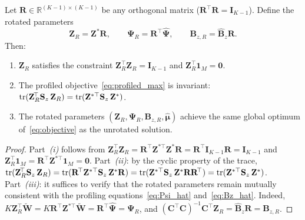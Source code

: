 \begin{proposition}
\label{prop:rotation_invariance}
Let $\mathbf{R}\in\mathbb{R}^{(K-1)\times(K-1)}$ be any orthogonal
matrix ($\mathbf{R}^{\!\top}\mathbf{R} = \mathbf{I}_{K-1}$). Define
the rotated parameters
\begin{equation}
  \mathbf{Z}_R = \mathbf{Z}^*\mathbf{R}, \qquad
  \boldsymbol{\Psi}_R = \mathbf{R}^{\!\top}\hat{\boldsymbol{\Psi}}, \qquad
  \mathbf{B}_{z,R} = \hat{\mathbf{B}}_z\mathbf{R}.
  \label{eq:rotated_params}
\end{equation}
Then:
\begin{enumerate}
  \item[\emph{(i)}]
    $\mathbf{Z}_R$ satisfies the constraint
    $\mathbf{Z}_R^{\!\top}\mathbf{Z}_R = \mathbf{I}_{K-1}$ and
    $\mathbf{Z}_R^{\!\top}\mathbf{1}_M = \mathbf{0}$.
  \item[\emph{(ii)}]
    The profiled objective~\eqref{eq:profiled_max} is invariant:
    $\operatorname{tr}(\mathbf{Z}_R^{\!\top}\mathbf{S}_z\,\mathbf{Z}_R)
     = \operatorname{tr}(\mathbf{Z}^{*\top}\mathbf{S}_z\,\mathbf{Z}^*)$.
  \item[\emph{(iii)}]
    The rotated parameters $(\mathbf{Z}_R,\boldsymbol{\Psi}_R,
    \mathbf{B}_{z,R},\hat{\boldsymbol{\mu}})$ achieve the same
    global optimum of~\eqref{eq:objective} as the unrotated solution.
\end{enumerate}
\end{proposition}
 
\begin{proof}
Part~\emph{(i)} follows from
$\mathbf{Z}_R^{\!\top}\mathbf{Z}_R
 = \mathbf{R}^{\!\top}\mathbf{Z}^{*\top}\mathbf{Z}^*\mathbf{R}
 = \mathbf{R}^{\!\top}\mathbf{I}_{K-1}\mathbf{R}
 = \mathbf{I}_{K-1}$
and $\mathbf{Z}_R^{\!\top}\mathbf{1}_M
 = \mathbf{R}^{\!\top}\mathbf{Z}^{*\top}\mathbf{1}_M
 = \mathbf{0}$.
Part~\emph{(ii)}: by the cyclic property of the trace,
$\operatorname{tr}(\mathbf{Z}_R^{\!\top}\mathbf{S}_z\,\mathbf{Z}_R)
 = \operatorname{tr}(\mathbf{R}^{\!\top}\mathbf{Z}^{*\top}\mathbf{S}_z\,
       \mathbf{Z}^*\mathbf{R})
 = \operatorname{tr}(\mathbf{Z}^{*\top}\mathbf{S}_z\,\mathbf{Z}^*
       \mathbf{R}\mathbf{R}^{\!\top})
 = \operatorname{tr}(\mathbf{Z}^{*\top}\mathbf{S}_z\,\mathbf{Z}^*)$.
Part~\emph{(iii)}: it suffices to verify that the rotated parameters
remain mutually consistent with the profiling
equations~\eqref{eq:Psi_hat} and~\eqref{eq:Bz_hat}. Indeed,
$K\mathbf{Z}_R^{\!\top}\widetilde{\mathbf{W}}
 = K\mathbf{R}^{\!\top}\mathbf{Z}^{*\top}\widetilde{\mathbf{W}}
 = \mathbf{R}^{\!\top}\hat{\boldsymbol{\Psi}}
 = \boldsymbol{\Psi}_R$,
and
$(\mathbf{C}^{\!\top}\mathbf{C})^{-1}\mathbf{C}^{\!\top}\mathbf{Z}_R
 = \hat{\mathbf{B}}_z\mathbf{R} = \mathbf{B}_{z,R}$.
\end{proof}
 
